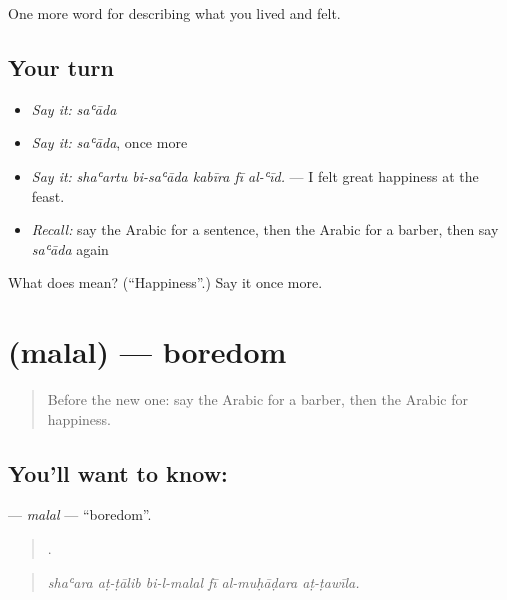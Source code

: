 \begin{grammarlens}[title={What you've built}]
One more word for describing what you lived and felt.
\end{grammarlens}

\subsection*{Your turn}
\begin{itemize}
\raggedright
  \item \emph{Say it:} \emph{saʿāda}
  \item \emph{Say it:} \emph{saʿāda}, once more
  \item \emph{Say it:} \emph{shaʿartu bi-saʿāda kabīra fī al-ʿīd.} — I felt great happiness at the feast.
  \item \emph{Recall:} say the Arabic for a sentence, then the Arabic for a barber, then say \emph{saʿāda} again
\end{itemize}

\begin{tcolorbox}[breakable,colback=teal!4,colframe=teal!35!black,title={Before you move on}]
What does  mean? (\textquotedblleft{}Happiness\textquotedblright{}.) Say it once more.
\end{tcolorbox}
\section[\texorpdfstring{\ar{ملل} (malal)}{ملل (malal)}]{ (malal) — boredom}

\label{lesson:AR-C488-malal}



\begin{quote}
Before the new one: say the Arabic for a barber, then the Arabic for happiness.
\end{quote}

\subsection*{You'll want to know: }
\textbf{} — \emph{malal} — \textquotedblleft{}boredom\textquotedblright{}.

\begin{quote}
     .
\end{quote}

\begin{quote}
\emph{shaʿara aṭ-ṭālib bi-l-malal fī al-muḥāḍara aṭ-ṭawīla.}
\end{quote}

